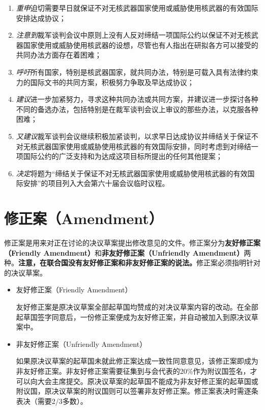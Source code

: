 \documentclass[a4paper,openany]{book}
\begin{document}
\begin{spacing}{1}
\begin{enumerate}
\setlength{\itemsep}{0pt}
\setlength{\parsep}{0pt}
\setlength{\parskip}{0pt}
\item \textit{重申}迫切需要早日就保证不对无核武器国家使用或威胁使用核武器的有效国际安排达成协议； 
\item \textit{注意到}裁军谈判会议中原则上没有人反对缔结一项国际公约以保证不对无核武器国家使用或威胁使用核武器的设想，尽管也有人指出在研拟各方可以接受的共同办法方面存在着困难； 
\item \textit{呼吁}所有国家，特别是核武器国家，就共同办法，特别是可载入具有法律约束力的国际文书的共同方案，积极努力争取及早达成协议； 
\item \textit{建议}进一步加紧努力，寻求这种共同办法或共同方案，并建议进一步探讨各种不同的备选办法，包括特别是在裁军谈判会议上审议的那些办法，以克服各种困难； 
\item \textit{又建议}裁军谈判会议继续积极加紧谈判，以求早日达成协议并缔结关于保证不对无核武器国家使用或威胁使用核武器的有效国际安排，同时考虑到对缔结一项国际公约的广泛支持和为达成这项目标所提出的任何其他提案； 
\item \textit{决定}将题为“缔结关于保证不对无核武器国家使用或威胁使用核武器的有效国际安排”的项目列入大会第六十届会议临时议程。
\end{enumerate}
\end{spacing}

\newpage

\section{修正案（Amendment）}

修正案是用来对正在讨论的决议草案提出修改意见的文件。修正案分为\textbf{友好修正案（Friendly Amendment）}和\textbf{非友好修正案（Unfriendly Amendment）}两种。\textbf{注意，在联合国没有友好修正案和非友好修正案的说法。}修正案必须指明针对的决议草案。

\begin{itemize}

\item 友好修正案（Friendly Amendment）

友好修正案是原决议草案全部起草国均赞成的对决议草案内容的改动。在全部起草国签字同意后，一份修正案便成为友好修正案，并自动被加入到原决议草案中。

\item 非友好修正案（Unfriendly Amendment）

如果原决议草案的起草国未就此修正案达成一致性同意意见，该修正案即成为非友好修正案。非友好修正案需要征集到与会代表的20\%作为附议国签名，才可以向大会主席提交。原决议草案的起草国不能成为非友好修正案的起草国或附议国，原决议草案的附议国则可以签署非友好修正案。修正案表决时需逐条表决（需要2/3多数）。

\end{itemize}
\end{document}
